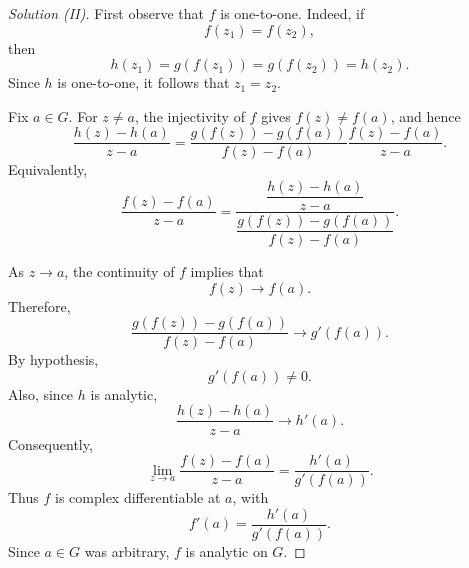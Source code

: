 \documentclass[12pt, a4paper]{report}
\theoremstyle{spaced}
\begin{document}
\begin{proof}[Solution (II)]
	First observe that \(f\) is one-to-one. Indeed, if
	\[
		f(z_1)=f(z_2),
	\]
	then
	\[
		h(z_1)=g(f(z_1))=g(f(z_2))=h(z_2).
	\]
	Since \(h\) is one-to-one, it follows that \(z_1=z_2\).

	Fix \(a\in G\). For \(z\neq a\), the injectivity of \(f\) gives
	\(f(z)\neq f(a)\), and hence
	\[
		\frac{h(z)-h(a)}{z-a}
		=
		\frac{g(f(z))-g(f(a))}{f(z)-f(a)}
		\frac{f(z)-f(a)}{z-a}.
	\]
	Equivalently,
	\[
		\frac{f(z)-f(a)}{z-a}
		=
		\frac{\dfrac{h(z)-h(a)}{z-a}}
		{\dfrac{g(f(z))-g(f(a))}{f(z)-f(a)}}.
	\]

	As \(z\to a\), the continuity of \(f\) implies that
	\[
		f(z)\to f(a).
	\]
	Therefore,
	\[
		\frac{g(f(z))-g(f(a))}{f(z)-f(a)}
		\longrightarrow g'(f(a)).
	\]
	By hypothesis,
	\[
		g'(f(a))\neq 0.
	\]
	Also, since \(h\) is analytic,
	\[
		\frac{h(z)-h(a)}{z-a}\longrightarrow h'(a).
	\]
	Consequently,
	\[
		\lim_{z\to a}\frac{f(z)-f(a)}{z-a}
		=
		\frac{h'(a)}{g'(f(a))}.
	\]
	Thus \(f\) is complex differentiable at \(a\), with
	\[
		f'(a)=\frac{h'(a)}{g'(f(a))}.
	\]
	Since \(a\in G\) was arbitrary, \(f\) is analytic on \(G\).
\end{proof}
\end{document}
